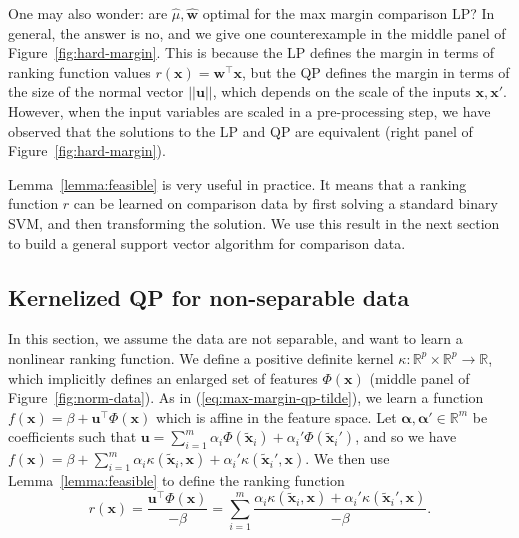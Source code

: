 \documentclass{article}
\newcommand{\RR}{\mathbb R}
\begin{document}
One may also wonder: are $\hat \mu,\mathbf{\hat w}$ optimal for the
max margin comparison LP? In general, the answer is no, and we give
one counterexample in the middle panel of
Figure~\ref{fig:hard-margin}. This is because the LP defines the
margin in terms of ranking function values $r(\mathbf x)=\mathbf
w^\intercal \mathbf x$, but the QP defines the margin in terms of the
size of the normal vector $||\mathbf u||$, which depends on the scale
of the inputs $\mathbf x,\mathbf x'$. However, when the input
variables are scaled in a pre-processing step, we have observed that
the solutions to the LP and QP are equivalent (right panel of
Figure~\ref{fig:hard-margin}).

Lemma~\ref{lemma:feasible} is very useful in practice. It means that a
ranking function $r$ can be learned on comparison data by first
solving a standard binary SVM, and then transforming the solution. We
use this result in the next section to build a general support vector
algorithm for comparison data.

\subsection{Kernelized QP for non-separable data}
\label{sec:kernelized-qp}
In this section, we assume the data are not separable, and want to
learn a nonlinear ranking function. We define a positive definite
kernel $\kappa:\RR^p\times \RR^p\rightarrow\RR$, which implicitly
defines an enlarged set of features $\Phi(\mathbf x)$ (middle panel of
Figure~\ref{fig:norm-data}). As in (\ref{eq:max-margin-qp-tilde}), we
learn a function $f(\mathbf x)=\beta + \mathbf u^\intercal
\Phi(\mathbf x)$ which is affine in the feature space. Let $\mathbf
\alpha,\mathbf \alpha'\in\RR^m$ be coefficients such that $\mathbf
u=\sum_{i=1}^m
\alpha_i \Phi(\mathbf{\tilde x}_i) + 
\alpha_i' \Phi(\mathbf{\tilde x}_i')$, and so we have
 $f(\mathbf x) =\beta + \sum_{i=1}^m 
 \alpha_i \kappa(\mathbf{\tilde x}_i, \mathbf x) +
 \alpha_i' \kappa(\mathbf{\tilde x}_i', \mathbf x)$. 
 We then use Lemma~\ref{lemma:feasible} to
define the ranking function
\begin{equation}
  \label{eq:kernelized_r}
  r(\mathbf x)= \frac{\mathbf u^\intercal \Phi(\mathbf x)}{-\beta} = 
  \sum_{i=1}^m
  \frac{
    \alpha_i \kappa(\mathbf{\tilde x}_i, \mathbf x) +
    \alpha_i'  \kappa(\mathbf{\tilde x}_i', \mathbf x)}
{-\beta}.
\end{equation}
\end{document}

